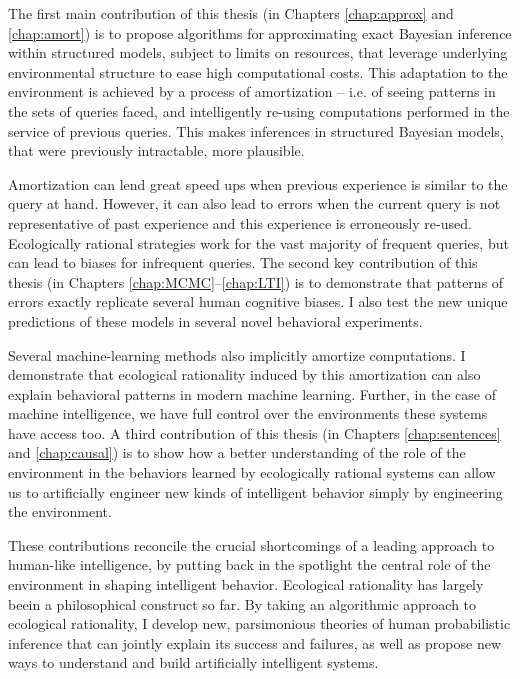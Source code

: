The first main contribution of this thesis (in Chapters \ref{chap:approx} and \ref{chap:amort}) is to propose algorithms for approximating exact Bayesian inference within structured models, subject to limits on resources, that leverage underlying environmental structure to ease high computational costs. This adaptation to the environment is achieved by a process of amortization -- i.e. of seeing patterns in the sets of queries faced, and intelligently re-using computations performed in the service of previous queries. This makes inferences in structured Bayesian models, that were previously intractable, more plausible.

Amortization can lend great speed ups when previous experience is similar to the query at hand. However, it can also lead to errors when the current query is not representative of past experience and this experience is erroneously re-used. Ecologically rational strategies work for the vast majority of frequent queries, but can lead to biases for infrequent queries. The second key contribution of this thesis (in Chapters \ref{chap:MCMC}--\ref{chap:LTI}) is to demonstrate that patterns of errors exactly replicate several human cognitive biases. I also test the new unique predictions of these models in several novel behavioral experiments.

Several machine-learning methods also implicitly amortize computations. I demonstrate that ecological rationality induced by this amortization can also explain behavioral patterns in modern machine learning. Further, in the case of machine intelligence, we have full control over the environments these systems have access too. A third contribution of this thesis (in Chapters \ref{chap:sentences} and \ref{chap:causal}) is to show how a better understanding of the role of the environment in the behaviors learned by ecologically rational systems can allow us to artificially engineer new kinds of intelligent behavior simply by engineering the environment.

These contributions reconcile the crucial shortcomings of a leading approach to human-like intelligence, by putting back in the spotlight the central role of the environment in shaping intelligent behavior. Ecological rationality has largely beein a philosophical construct so far. By taking an algorithmic approach to ecological rationality, I develop new, parsimonious theories of human probabilistic inference that can jointly explain its success and failures, as well as propose new ways to understand and build artificially intelligent systems.
